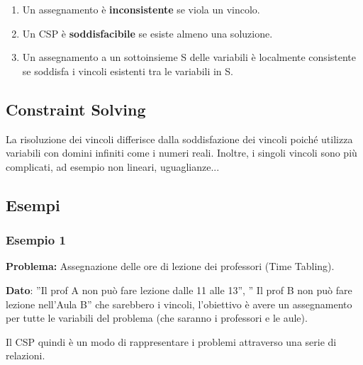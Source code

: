 \begin{enumerate}
    \item Un assegnamento è \textbf{inconsistente} se viola un vincolo.
    \item Un CSP è \textbf{soddisfacibile} se esiste almeno una soluzione.
    \item Un assegnamento a un sottoinsieme S delle variabili è localmente consistente se soddisfa i vincoli esistenti tra le variabili in S.
\end{enumerate}

\subsection{Constraint Solving}
La risoluzione dei vincoli differisce dalla soddisfazione dei vincoli poiché utilizza variabili con domini infiniti come i numeri reali. Inoltre, i singoli vincoli sono più complicati, ad esempio non lineari, uguaglianze...
\subsection{Esempi}
\subsubsection{Esempio 1}
\textbf{Problema:} Assegnazione delle ore di lezione dei professori (Time Tabling).

\vspace{0.2cm}

\noindent \textbf{Dato}: ”Il prof A non può fare lezione dalle 11 alle 13”, ” Il prof B non può fare lezione nell’Aula B” che sarebbero i vincoli, l’obiettivo è avere un assegnamento per tutte le variabili del problema (che saranno i professori e le aule).
\vspace{0.2cm}

\noindent Il CSP quindi è un modo di rappresentare i problemi attraverso una serie di relazioni.
\vspace{0.2cm}

